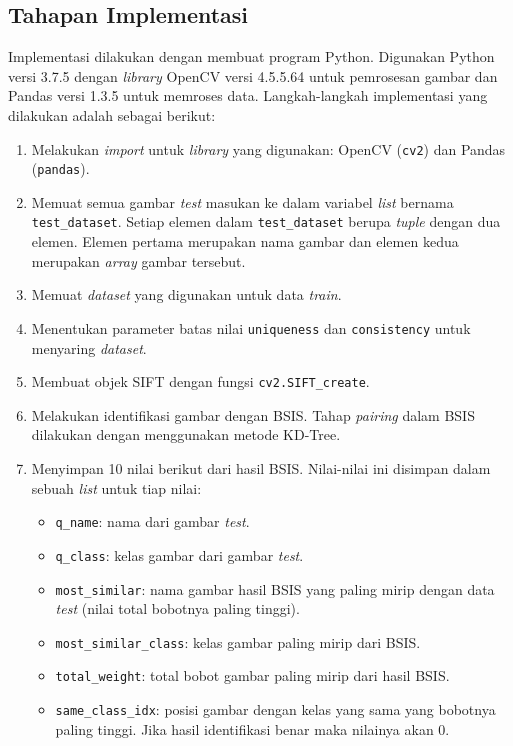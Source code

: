 \subsection{Tahapan Implementasi}
\label{subsec:analisis_oir_tahapan_implementasi}
Implementasi dilakukan dengan membuat program Python. Digunakan Python versi 3.7.5 dengan \textit{library} OpenCV versi 4.5.5.64 untuk pemrosesan gambar dan Pandas versi 1.3.5 untuk memroses data. Langkah-langkah implementasi yang dilakukan adalah sebagai berikut:
\begin{enumerate}
	\item Melakukan \textit{import} untuk \textit{library} yang digunakan: OpenCV (\texttt{cv2}) dan Pandas (\texttt{pandas}).
	\item Memuat semua gambar \textit{test} masukan ke dalam variabel \textit{list} bernama \texttt{test\_dataset}. Setiap elemen dalam \texttt{test\_dataset} berupa \textit{tuple} dengan dua elemen. Elemen pertama merupakan nama gambar dan elemen kedua merupakan \textit{array} gambar tersebut.
	\item Memuat \textit{dataset} yang digunakan untuk data \textit{train}.
	\item Menentukan parameter batas nilai \texttt{uniqueness} dan \texttt{consistency} untuk menyaring \textit{dataset}. 
	\item Membuat objek SIFT dengan fungsi \texttt{cv2.SIFT\_create}.
	\item Melakukan identifikasi gambar dengan BSIS. Tahap \textit{pairing} dalam BSIS dilakukan dengan menggunakan metode KD-Tree.
	\item Menyimpan 10 nilai berikut dari hasil BSIS. Nilai-nilai ini disimpan dalam sebuah \textit{list} untuk tiap nilai:
	\begin{itemize}
		\item \texttt{q\_name}: nama dari gambar \textit{test}.
		\item \texttt{q\_class}: kelas gambar dari gambar \textit{test}.
		\item \texttt{most\_similar}: nama gambar hasil BSIS yang paling mirip dengan data \textit{test} (nilai total bobotnya paling tinggi).
		\item \texttt{most\_similar\_class}: kelas gambar paling mirip dari BSIS.
		\item \texttt{total\_weight}: total bobot gambar paling mirip dari hasil BSIS.
		\item \texttt{same\_class\_idx}: posisi gambar dengan kelas yang sama yang bobotnya paling tinggi. Jika hasil identifikasi benar maka nilainya akan 0.

\end{itemize}
\end{enumerate}
